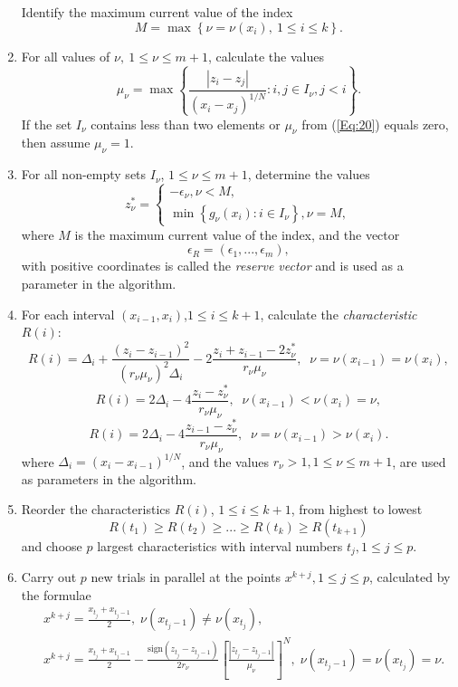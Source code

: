 \documentclass{llncs}
\begin{document}
\begin{enumerate}
Identify the maximum current value of the index
\begin{equation}\label{Eq:19}
M=\max \left\{\nu = \nu(x_i), \ 1\leq i \leq k\right\}.
\end{equation}
\item
For all values of $\nu, \ 1\leq \nu \leq m+1$, calculate the values  
\begin{equation}\label{Eq:20}
\mu_\nu = \max \left\{ \frac{\left|z_i-z_j\right|}{\left(x_i-x_j\right)^{1/N}} : i,j \in I_\nu, j<i\right\}.
\end{equation}
If the set $I_\nu$ contains less than two elements or $\mu_\nu$ from (\ref{Eq:20}) equals zero, then assume $\mu_\nu=1$.
\item
For all non-empty sets $I_\nu$, $1 \leq \nu \leq m+1$, determine the values
\begin{equation}\label{Eq:21}
  z^\ast_\nu =  
   \begin{cases}
    -\epsilon_\nu,  \nu < M, \\
    \min{\left\{g_\nu(x_i):i\in I_\nu\right\}}, \nu = M,
   \end{cases}
\end{equation}
where $M$ is the maximum current value of the index, and the vector
\begin{equation}\label{Eq:22}
\epsilon _R=\left(\epsilon_1,...,\epsilon_m\right),
\end{equation}
with positive coordinates is called the \textit{reserve vector} and is used as a parameter in the algorithm.
\item
For each interval $(x_{i-1},x_i)$,$1 \leq i \leq k+1$, calculate the \textit{characteristic} $R(i)$: 
\[
R(i)=\Delta_i+ \frac{(z_i-z_{i-1})^2}{(r_\nu\mu_\nu)^2\Delta_i}-2\frac{z_i+z_{i-1}-2z^\ast_\nu}{r_\nu\mu_\nu},\;\; \nu=\nu(x_{i-1})=\nu(x_i),
\]
\[
R(i)= 2\Delta_i-4\frac{z_i-z^\ast_\nu}{r_\nu\mu_\nu},\;\; \nu(x_{i-1})<\nu(x_i)=\nu,
\]
\[
R(i)= 2\Delta_i-4\frac{z_{i-1}-z^\ast_\nu}{r_\nu\mu_\nu},\;\; \nu = \nu(x_{i-1})>\nu(x_i).
\]
where $\Delta_i=(x_i-x_{i-1})^{1/N}$, and the values $r_\nu>1, 1\leq\nu\leq m+1$, are used as parameters in the algorithm.
\item
Reorder the characteristics $R(i)$, $1\leq i \leq k+1$, from highest to lowest 	
\begin{equation}\label{Eq:23}
R(t_1)\geq R(t_2)\geq ... \geq R(t_{k})\geq R(t_{k+1})
\end{equation}
and choose $p$ largest characteristics with interval numbers $t_j, 1\leq j \leq p$.
\item
Carry out $p$ new trials in parallel at the points $x^{k+j}, 1 \leq j \leq p$, calculated by the formulae
\begin{eqnarray*}
& x^{k+j}=\frac{x_{t_j}+x_{t_j-1}}{2}, \; \nu(x_{t_j-1})\neq \nu(x_{t_j}), \\
& x^{k+j}=\frac{x_{t_j}+x_{t_j-1}}{2}- \frac{\mathrm{sign}(z_{t_j}-z_{t_j-1})}{2r_\nu}\left[\frac{\left|z_{t_j}-z_{t_j-1}\right|}{\mu_\nu}\right]^N, \; \nu(x_{t_j-1})=\nu(x_{t_j})=\nu. \\
\end{eqnarray*} 


\end{enumerate}
\end{document}
